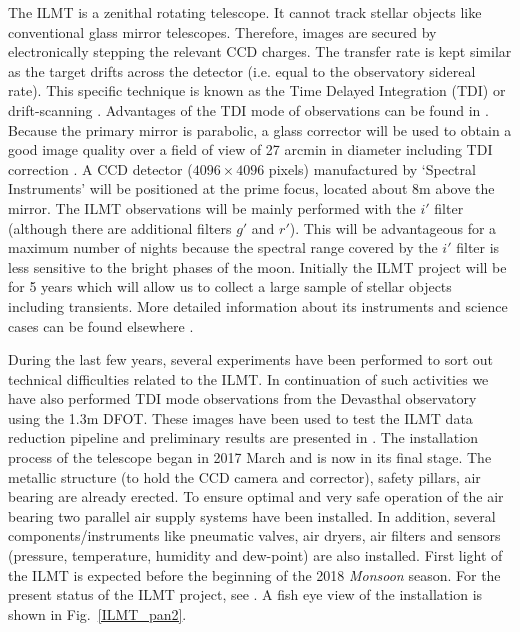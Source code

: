 \documentclass[useAMS,usenatbib]{mnras}
\begin{document}
The ILMT is a zenithal rotating telescope. It cannot track stellar objects like conventional 
glass mirror telescopes. Therefore, images are secured by electronically stepping the relevant CCD charges. 
The transfer rate is kept similar as the target drifts across the detector (i.e. equal to the observatory 
sidereal rate). This specific technique is known as the Time Delayed Integration (TDI) or drift-scanning 
\citep[see][and references therein]{1992MNRAS.258..543G}. Advantages of the TDI mode of observations 
can be found in \citet[][and references therein]{Kumar2014}. Because the primary mirror is parabolic, a 
glass corrector will be used to obtain a good image quality over a field of view of 27 arcmin in diameter 
including TDI correction \citep[see][]{1998PASP..110.1081H,2002A&A...388..712V}.
A CCD detector ($4096\times4096$ pixels) manufactured by `Spectral Instruments' will be positioned at 
the prime focus, located about 8m above the mirror. The ILMT observations will be mainly performed with 
the $i'$ filter (although there are additional filters $g'$ and $r'$). This will be advantageous 
for a maximum number of nights because the spectral range covered by the $i'$ filter is less sensitive 
to the bright phases of the moon. Initially the ILMT project will be for 5 years which will allow us to
collect a large sample of stellar objects including transients.
More detailed information about its instruments and science cases can be found 
elsewhere \citep[e.g.][and references therein]{2006SPIE.6267E...4S,Jean_bina,Magette2010,
2012IAUS..285..394P,Finet2013,Kumar2014,2015ASInC..12..149K,Kumar_bina}.


During the last few years, several experiments have been performed to sort out technical difficulties
related to the ILMT. In continuation of such activities we have also performed TDI mode observations 
from the Devasthal observatory using the 1.3m DFOT. These images have been used to test the ILMT data 
reduction pipeline and preliminary results are presented in \citet{Pradhan_bina}. The installation 
process of the telescope began in 2017 March and is now in its final stage. 
The metallic structure (to hold the CCD camera and corrector), safety pillars, air bearing are already 
erected. To ensure optimal and very safe operation of the air bearing two parallel air supply systems 
have been installed. In addition, several components/instruments like pneumatic valves, air dryers, 
air filters and sensors (pressure, temperature, humidity and dew-point) are also installed. 
First light of the ILMT is expected before the beginning of the 2018 {\it Monsoon} season. 
For the present status of the ILMT project, see \citet{Jean_bina}.
A fish eye view of the installation is shown in Fig.~\ref{ILMT_pan2}. 
\end{document}
